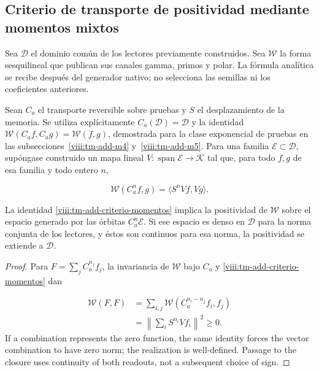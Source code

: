 \subsection{Criterio de transporte de positividad mediante momentos mixtos}
\label{viii:tm-add-c5}
Sea \(\mathcal D\) el dominio común de los lectores previamente construidos. Sea \(\mathscr W\) la forma sesquilineal que publican sus canales gamma, primos y polar. La fórmula analítica se recibe después del generador nativo; no selecciona las semillas ni los coeficientes anteriores.

Sean \(C_a\) el transporte reversible sobre pruebas y \(S\) el desplazamiento de la memoria. Se utiliza explícitamente \(C_a(\mathcal D)=\mathcal D\) y la identidad \(\mathscr W(C_af,C_ag)=\mathscr W(f,g)\), demostrada para la clase exponencial de pruebas en las subsecciones~\ref{viii:tm-add-m4} y~\ref{viii:tm-add-m5}. Para una familia \(\mathcal E\subset\mathcal D\), supóngase construido un mapa lineal \(V:\operatorname{span}\mathcal E\to\mathcal K\) tal que, para todo \(f,g\) de esa familia y todo entero \(n\),

\begin{equation}
\boxed{\mathscr W(C_a^n f,g)=\langle S^nVf,Vg\rangle.}
\label{viii:tm-add-criterio-momentos}
\end{equation}
\begin{proposition}
\label{viii:tm-add-proposicion-costura-3}
La identidad \eqref{viii:tm-add-criterio-momentos} implica la positividad de \(\mathscr W\) sobre el espacio generado por las órbitas \(C_a^n\mathcal E\). Si ese espacio es denso en \(\mathcal D\) para la norma conjunta de los lectores, y éstos son continuos para esa norma, la positividad se extiende a \(\mathcal D\).
\end{proposition}

\begin{proof}
Para \(F=\sum_j C_a^{n_j}f_j\), la invariancia de \(\mathscr W\) bajo \(C_a\) y \eqref{viii:tm-add-criterio-momentos} dan

\[
\begin{aligned}
\mathscr W(F,F)
&=\sum_{i,j}\mathscr W(C_a^{n_i-n_j}f_i,f_j)\\
&=\left\|\sum_i S^{n_i}Vf_i\right\|^2\geq0.
\end{aligned}
\]
If a combination represents the zero function, the same identity forces the vector combination to have zero norm; the realization is well-defined. Passage to the closure uses continuity of both readouts, not a subsequent choice of sign.
\end{proof}

